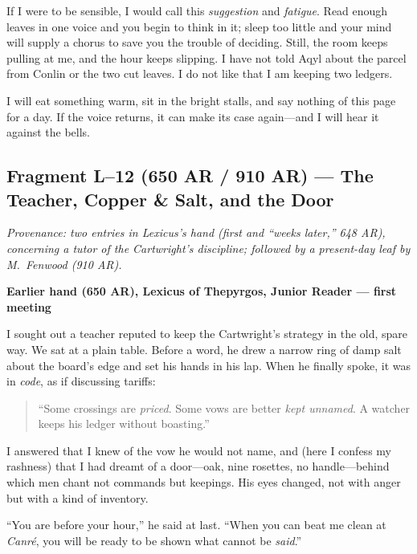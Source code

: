 \documentclass[11pt]{article}
\begin{document}
If I were to be sensible, I would call this \emph{suggestion} and \emph{fatigue}. Read enough leaves in one voice and you begin to think in it; sleep too little and your mind will supply a chorus to save you the trouble of deciding. Still, the room keeps pulling at me, and the hour keeps slipping. I have not told Aqyl about the parcel from Conlin or the two cut leaves. I do not like that I am keeping two ledgers.

I will eat something warm, sit in the bright stalls, and say nothing of this page for a day. If the voice returns, it can make its case again—and I will hear it against the bells.

\subsection*{Fragment L--12 (650 AR / 910 AR) --- The Teacher, Copper \& Salt, and the Door}
\label{frag:l12}
{}

\noindent\textit{Provenance: two entries in Lexicus’s hand (first and “weeks later,” 648 AR), concerning a tutor of the Cartwright’s discipline; followed by a present-day leaf by M.\ Fenwood (910 AR).}

\medskip
\noindent\textbf{Earlier hand (650 AR), Lexicus of Thepyrgos, Junior Reader — first meeting}

I sought out a teacher reputed to keep the Cartwright’s strategy in the old, spare way. We sat at a plain table. Before a word, he drew a narrow ring of damp salt about the board’s edge and set his hands in his lap. When he finally spoke, it was in \emph{code}, as if discussing tariffs:

\begin{quote}\small
“Some crossings are \emph{priced}. Some vows are better \emph{kept unnamed}. A watcher keeps his ledger without boasting.”
\end{quote}

I answered that I knew of the vow he would not name, and (here I confess my rashness) that I had dreamt of a door—oak, nine rosettes, no handle—behind which men chant not commands but keepings. His eyes changed, not with anger but with a kind of inventory.

“You are before your hour,” he said at last. “When you can beat me clean at \textit{Canr\'e}, you will be ready to be shown what cannot be \emph{said}.”
\end{document}
